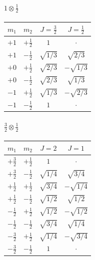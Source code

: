 \documentclass[11pt]{article}
\theoremstyle{plain}
\theoremstyle{definition}
\theoremstyle{remark}
\begin{document}
\paragraph{$1 \otimes \tfrac12$}
\begin{center}
\begin{tabular}{cc|cc}
\toprule
$m_1$ & $m_2$ & $J=\tfrac{3}{2}$ & $J=\tfrac{1}{2}$ \\
\midrule
$+1$ & $+\tfrac{1}{2}$ & $1$ & $\cdot$ \\
\midrule
$+1$ & $-\tfrac{1}{2}$ & $\sqrt{1/3}$ & $\sqrt{2/3}$ \\
$+0$ & $+\tfrac{1}{2}$ & $\sqrt{2/3}$ & $-\sqrt{1/3}$ \\
\midrule
$+0$ & $-\tfrac{1}{2}$ & $\sqrt{2/3}$ & $\sqrt{1/3}$ \\
$-1$ & $+\tfrac{1}{2}$ & $\sqrt{1/3}$ & $-\sqrt{2/3}$ \\
\midrule
$-1$ & $-\tfrac{1}{2}$ & $1$ & $\cdot$ \\
\bottomrule
\end{tabular}
\end{center}

\paragraph{$\tfrac32 \otimes \tfrac12$}
\begin{center}
\begin{tabular}{cc|cc}
\toprule
$m_1$ & $m_2$ & $J=2$ & $J=1$ \\
\midrule
$+\tfrac{3}{2}$ & $+\tfrac{1}{2}$ & $1$ & $\cdot$ \\
\midrule
$+\tfrac{3}{2}$ & $-\tfrac{1}{2}$ & $\sqrt{1/4}$ & $\sqrt{3/4}$ \\
$+\tfrac{1}{2}$ & $+\tfrac{1}{2}$ & $\sqrt{3/4}$ & $-\sqrt{1/4}$ \\
\midrule
$+\tfrac{1}{2}$ & $-\tfrac{1}{2}$ & $\sqrt{1/2}$ & $\sqrt{1/2}$ \\
$-\tfrac{1}{2}$ & $+\tfrac{1}{2}$ & $\sqrt{1/2}$ & $-\sqrt{1/2}$ \\
\midrule
$-\tfrac{1}{2}$ & $-\tfrac{1}{2}$ & $\sqrt{3/4}$ & $\sqrt{1/4}$ \\
$-\tfrac{3}{2}$ & $+\tfrac{1}{2}$ & $\sqrt{1/4}$ & $-\sqrt{3/4}$ \\
\midrule
$-\tfrac{3}{2}$ & $-\tfrac{1}{2}$ & $1$ & $\cdot$ \\
\bottomrule
\end{tabular}
\end{center}
\end{document}
